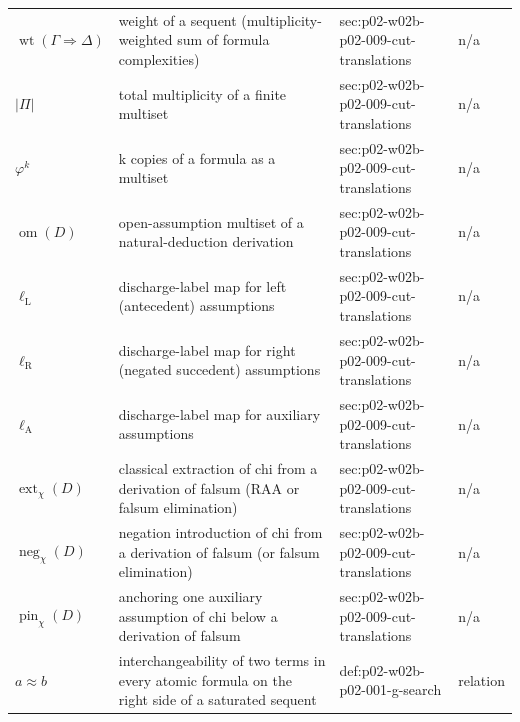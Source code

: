 \begin{longtable}{@{}p{}p{}p{}p{}@{}}
\(\operatorname{wt}(\Gamma\Rightarrow\Delta)\) & weight of a sequent (multiplicity-weighted sum of formula complexities) & sec:\allowbreak{}p02-\allowbreak{}w02b-\allowbreak{}p02-\allowbreak{}009-\allowbreak{}cut-\allowbreak{}translations & n/a \\
\(|\Pi|\) & total multiplicity of a finite multiset & sec:\allowbreak{}p02-\allowbreak{}w02b-\allowbreak{}p02-\allowbreak{}009-\allowbreak{}cut-\allowbreak{}translations & n/a \\
\(\varphi^{k}\) & k copies of a formula as a multiset & sec:\allowbreak{}p02-\allowbreak{}w02b-\allowbreak{}p02-\allowbreak{}009-\allowbreak{}cut-\allowbreak{}translations & n/a \\
\(\operatorname{om}(D)\) & open-assumption multiset of a natural-deduction derivation & sec:\allowbreak{}p02-\allowbreak{}w02b-\allowbreak{}p02-\allowbreak{}009-\allowbreak{}cut-\allowbreak{}translations & n/a \\
\(\ell_{\mathrm L}\) & discharge-label map for left (antecedent) assumptions & sec:\allowbreak{}p02-\allowbreak{}w02b-\allowbreak{}p02-\allowbreak{}009-\allowbreak{}cut-\allowbreak{}translations & n/a \\
\(\ell_{\mathrm R}\) & discharge-label map for right (negated succedent) assumptions & sec:\allowbreak{}p02-\allowbreak{}w02b-\allowbreak{}p02-\allowbreak{}009-\allowbreak{}cut-\allowbreak{}translations & n/a \\
\(\ell_{\mathrm A}\) & discharge-label map for auxiliary assumptions & sec:\allowbreak{}p02-\allowbreak{}w02b-\allowbreak{}p02-\allowbreak{}009-\allowbreak{}cut-\allowbreak{}translations & n/a \\
\(\operatorname{ext}_\chi(D)\) & classical extraction of chi from a derivation of falsum (RAA or falsum elimination) & sec:\allowbreak{}p02-\allowbreak{}w02b-\allowbreak{}p02-\allowbreak{}009-\allowbreak{}cut-\allowbreak{}translations & n/a \\
\(\operatorname{neg}_\chi(D)\) & negation introduction of chi from a derivation of falsum (or falsum elimination) & sec:\allowbreak{}p02-\allowbreak{}w02b-\allowbreak{}p02-\allowbreak{}009-\allowbreak{}cut-\allowbreak{}translations & n/a \\
\(\operatorname{pin}_\chi(D)\) & anchoring one auxiliary assumption of chi below a derivation of falsum & sec:\allowbreak{}p02-\allowbreak{}w02b-\allowbreak{}p02-\allowbreak{}009-\allowbreak{}cut-\allowbreak{}translations & n/a \\
\(a\approx b\) & interchangeability of two terms in every atomic formula on the right side of a saturated sequent & def:\allowbreak{}p02-\allowbreak{}w02b-\allowbreak{}p02-\allowbreak{}001-\allowbreak{}g-\allowbreak{}search & relation \\

\end{longtable}
